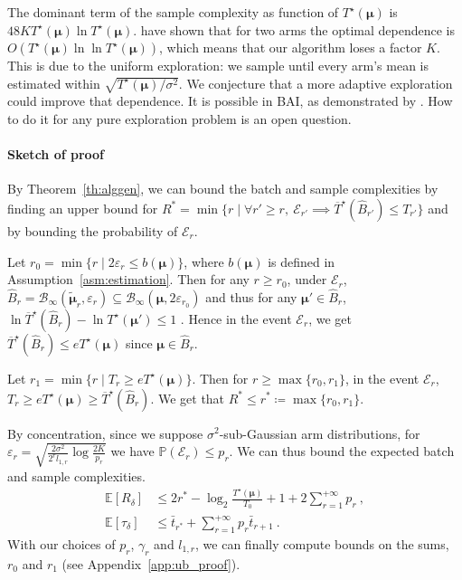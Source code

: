 The dominant term of the sample complexity as function of $T^\star(\bm\mu)$ is $48 K T^\star(\bm\mu) \ln T^\star(\bm\mu)$. \citet{jamiesonLilUCBOptimal2014} have shown that for two arms the optimal dependence is $O(T^\star(\bm\mu) \ln\ln T^\star(\bm\mu))$, which means that our algorithm loses a factor $K$.
This is due to the uniform exploration: we sample until every arm's mean is estimated within $\sqrt{T^\star(\bm\mu)/\sigma^2}$.
We conjecture that a more adaptive exploration could improve that dependence.
It is possible in BAI, as demonstrated by \citet{jinOptimalBatchedBest2023}. How to do it for any pure exploration problem is an open question.


\paragraph{Sketch of proof}
By Theorem~\ref{th:alggen}, we can bound the batch and sample complexities by finding an upper bound for $R^* = \min \{r \mid \forall r' \ge r, \ \mathcal E_{r'} \implies \overline{T}^\star(\hat{B}_{r'}) \le T_{r'}\}$ and by bounding the probability of $\mathcal E_r$.


Let $r_0 = \min\{r \mid 2 \varepsilon_r \le b(\bm\mu)\}$, where $b(\bm\mu)$ is defined in Assumption~\ref{asm:estimation}.
Then for any $r \ge r_0$, under $\mathcal E_{r}$,
$\hat{B}_{r} = \mathcal B_{\infty}(\tilde{\bm\mu}_r, \varepsilon_r) \subseteq \mathcal B_{\infty}(\bm\mu, 2\varepsilon_{r_0})$ and thus for any $\bm\mu' \in \hat{B}_{r}$,
$\ln \overline{T}^\star(\hat{B}_{r}) - \ln T^\star(\bm\mu') \le 1$ .
Hence in the event $\mathcal E_{r}$, we get $\overline{T}^\star(\hat{B}_{r}) \le e T^\star(\bm\mu)$ since $\bm\mu \in \hat{B}_r$.

Let $r_1 = \min \{r \mid T_r \ge e T^\star(\bm\mu)\}$.
Then for $r \ge \max\{r_0, r_1\}$, in the event $\mathcal E_{r}$, $T_r \ge e T^\star(\bm\mu) \ge \overline{T}^\star(\hat{B}_{r})$.
We get that $R^* \le r^* \coloneqq \max\{r_0, r_1\}$.

By concentration, since we suppose $\sigma^2$-sub-Gaussian arm distributions, for $\varepsilon_r = \sqrt{\frac{2 \sigma^2}{2^r l_{1,r}} \log \frac{2 K}{p_r}}$ we have $\mathbb{P}(\mathcal E_r) \le p_r$.
We can thus bound the expected batch and sample complexities.
\begin{align*}
\mathbb{E}\left[R_\delta\right]
&\le 2r^* - \log_2 \frac{T^\star(\bm\mu)}{T_0} + 1 + 2\sum_{r = 1}^{+\infty} p_r
\: , \\
\mathbb{E}\left[\tau_\delta\right]
&\le \bar{t}_{r^*} + \sum_{r = 1}^{+\infty} p_{r} \bar{t}_{r+1}
\: .
\end{align*}
With our choices of $p_r$, $\gamma_r$ and $l_{1,r}$, we can finally compute bounds on the sums, $r_0$ and $r_1$ (see Appendix~\ref{app:ub_proof}).


